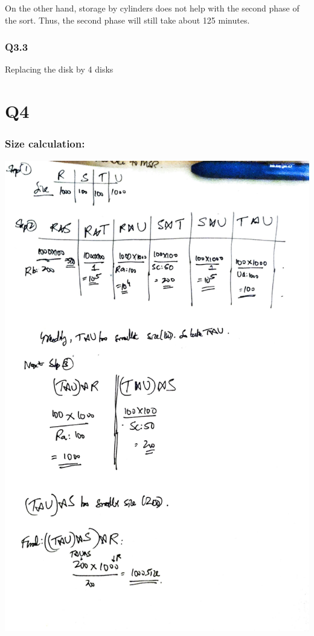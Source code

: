 \documentclass{article}
\begin{document}
On the other hand, storage by cylinders does not help with the second phase
of the sort. Thus, the second phase will still take about 125 minutes.

\subsubsection{Q3.3}

Replacing the disk by 4 disks





\section{Q4}
\subsubsection{Size calculation:}
\includegraphics[width=\textwidth]{db-q4-1.pdf}
\end{document}

